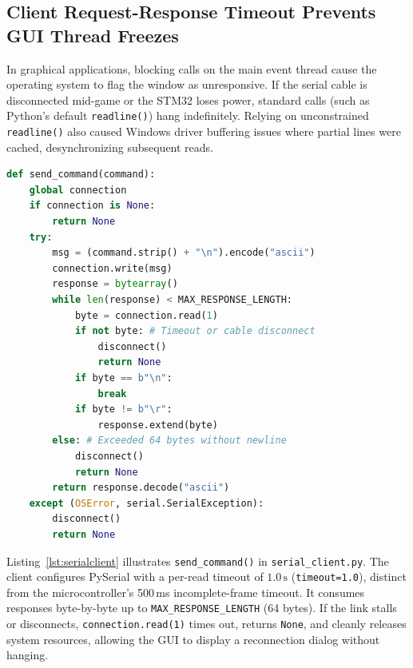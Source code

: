 \subsection{Client Request-Response Timeout Prevents GUI Thread Freezes}

In graphical applications, blocking calls on the main event thread cause the operating system to flag the window as unresponsive. If the serial cable is disconnected mid-game or the STM32 loses power, standard calls (such as Python's default \texttt{readline()}) hang indefinitely. Relying on unconstrained \texttt{readline()} also caused Windows driver buffering issues where partial lines were cached, desynchronizing subsequent reads.

\begin{lstlisting}[language=Python, caption={Bounded request-response reader with timeout (\texttt{serial\_client.py}).}, label=lst:serialclient]
def send_command(command):
    global connection
    if connection is None:
        return None
    try:
        msg = (command.strip() + "\n").encode("ascii")
        connection.write(msg)
        response = bytearray()
        while len(response) < MAX_RESPONSE_LENGTH:
            byte = connection.read(1)
            if not byte: # Timeout or cable disconnect
                disconnect()
                return None
            if byte == b"\n":
                break
            if byte != b"\r":
                response.extend(byte)
        else: # Exceeded 64 bytes without newline
            disconnect()
            return None
        return response.decode("ascii")
    except (OSError, serial.SerialException):
        disconnect()
        return None
\end{lstlisting}

Listing~\ref{lst:serialclient} illustrates \texttt{send\_command()} in \texttt{serial\_client.py}. The client configures PySerial with a per-read timeout of $1.0\,\text{s}$ (\texttt{timeout=1.0}), distinct from the microcontroller's 500\,ms incomplete-frame timeout. It consumes responses byte-by-byte up to \texttt{MAX\_RESPONSE\_LENGTH} (64 bytes). If the link stalls or disconnects, \texttt{connection.read(1)} times out, returns \texttt{None}, and cleanly releases system resources, allowing the GUI to display a reconnection dialog without hanging.

